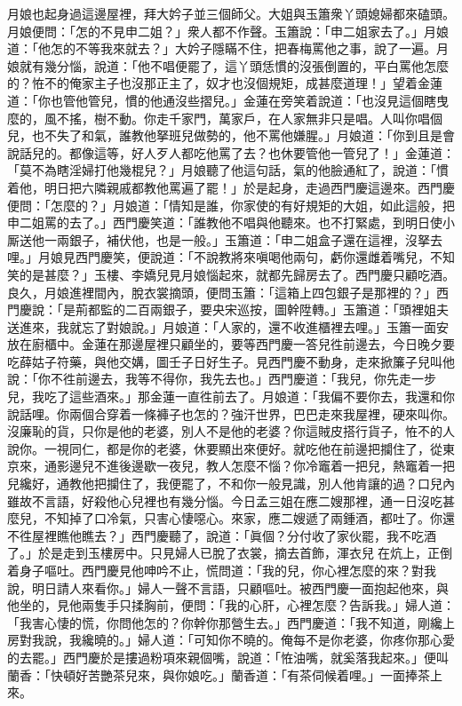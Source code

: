 月娘也起身過這邊屋裡，拜大妗子並三個師父。大姐與玉簫衆丫頭媳婦都來磕頭。月娘便問：「怎的不見申二姐？」衆人都不作聲。玉簫說：「申二姐家去了。」月娘道：「他怎的不等我來就去？」大妗子隱瞞不住，把春梅罵他之事，說了一遍。月娘就有幾分惱，{}說道：「他不唱便罷了，這丫頭恁慣的沒張倒置的，平白罵他怎麼的？恠不的俺家主子也沒那正主了，奴才也沒個規矩，成甚麼道理！」{}望着金蓮道：「你也管他管兒，慣的他通沒些摺兒。」金蓮在旁笑着說道：「也沒見這個瞎曳麼的，風不搖，樹不動。你走千家門，萬家戶，在人家無非只是唱。人叫你唱個兒，也不失了和氣，誰教他拏班兒做勢的，他不罵他嫌腥。」月娘道：「你到且是會說話兒的。都像這等，好人歹人都吃他罵了去？也休要管他一管兒了！」金蓮道：「莫不為瞎淫婦打他幾棍兒？」{}月娘聽了他這句話，氣的他臉通紅了，說道：「慣着他，明日把六隣親戚都教他罵遍了罷！」於是起身，走過西門慶這邊來。西門慶便問：「怎麼的？」月娘道：「情知是誰，你家使的有好規矩的大姐，如此這般，把申二姐罵的去了。」西門慶笑道：「誰教他不唱與他聽來。{}也不打緊處，到明日使小厮送他一兩銀子，補伏他，也是一般。」玉簫道：「申二姐盒子還在這裡，沒拏去哩。」月娘見西門慶笑，便說道：「不說教將來嗔喝他兩句，{}虧你還雌着嘴兒，不知笑的是甚麼？」玉樓、李嬌兒見月娘惱起來，就都先歸房去了。西門慶只顧吃酒。良久，月娘進裡間內，脫衣裳摘頭，便問玉簫：「這箱上四包銀子是那裡的？」西門慶說：「是荊都監的二百兩銀子，要央宋巡按，圖幹陞轉。」玉簫道：「頭裡姐夫送進來，我就忘了對娘說。」月娘道：「人家的，還不收進櫃裡去哩。」玉簫一面安放在廚櫃中。金蓮在那邊屋裡只顧坐的，要等西門慶一答兒徃前邊去，今日晚夕要吃薛姑子符藥，與他交媾，圖壬子日好生子。見西門慶不動身，走來掀簾子兒叫他說：「你不徃前邊去，我等不得你，我先去也。」{}西門慶道：「我兒，你先走一步兒，我吃了這些酒來。」那金蓮一直徃前去了。月娘道：「我偏不要你去，{}我還和你說話哩。你兩個合穿着一條褲子也怎的？強汗世界，巴巴走來我屋裡，硬來叫你。沒廉恥的貨，只你是他的老婆，別人不是他的老婆？你這賊皮搭行貨子，恠不的人說你。一視同仁，都是你的老婆，休要顯出來便好。{}就吃他在前邊把攔住了，從東京來，通影邊兒不進後邊歇一夜兒，教人怎麼不惱？你冷竈着一把兒，熱竈着一把兒纔好，通教他把攔住了，我便罷了，不和你一般見識，別人他肯讓的過？{}口兒內雖故不言語，好殺他心兒裡也有幾分惱。{}今日孟三姐在應二嫂那裡，通一日沒吃甚麼兒，不知掉了口冷氣，只害心悽噁心。來家，應二嫂遞了兩鍾酒，都吐了。你還不徃屋裡瞧他瞧去？」{}西門慶聽了，說道：「眞個？分付收了家伙罷，我不吃酒了。」於是走到玉樓房中。只見婦人已脫了衣裳，摘去首飾，渾衣兒𢱉在炕上，正倒着身子嘔吐。西門慶見他呻吟不止，慌問道：「我的兒，你心裡怎麼的來？對我說，明日請人來看你。」{}婦人一聲不言語，只顧嘔吐。被西門慶一面抱起他來，與他坐的，見他兩隻手只揉胸前，便問：「我的心肝，心裡怎麼？告訴我。」婦人道：「我害心悽的慌，你問他怎的？你幹你那營生去。」西門慶道：「我不知道，剛纔上房對我說，我纔曉的。」婦人道：「可知你不曉的。{}俺每不是你老婆，你疼你那心愛的去罷。」西門慶於是摟過粉項來親個嘴，說道：「恠油嘴，就奚落我起來。」便叫蘭香：「快頓好苦艷茶兒來，與你娘吃。」蘭香道：「有茶伺候着哩。」一面捧茶上來。

